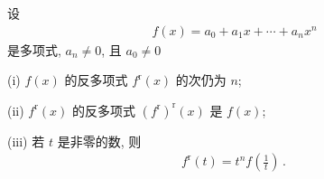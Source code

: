 \begin{proposition}
    设
    \begin{align*}
        f(x) = a_0 + a_1 x + \cdots + a_n x^n
    \end{align*}
    是多项式, $a_n \neq 0$, 且 $a_0 \neq 0$\period

    (i) $f(x)$ 的反多项式 $f^{\mathrm{r}} (x)$ 的次仍为 $n$;

    (ii) $f^{\mathrm{r}}(x)$ 的反多项式 $(f^{\mathrm{r}})^{\mathrm{r}} (x)$ 是 $f(x)$;

    (iii) 若 $t$ 是非零的数, 则
    \begin{align*}
        f^{\mathrm{r}} (t) = t^n f \left( \frac{1}{t} \right) \period
    \end{align*}
\end{proposition}

